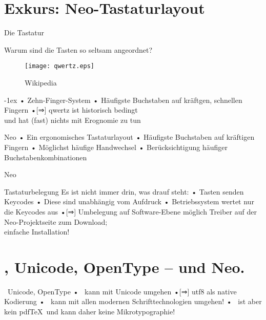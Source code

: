 \section{Exkurs: Neo-Tastaturlayout}
\begin{frame}{Die Tastatur}
\centerline{Warum sind die Tasten so seltsam angeordnet?}
\begin{figure}
\texttt{[image: qwertz.eps]}
\caption{ Wikipedia}
\end{figure}
\pause\kern-1ex
• Zehn-Finger-System
• Häufigste Buchstaben auf kräftgen, schnellen Fingern%
\pause%
•[⇒] \alert{qwertz ist historisch bedingt\\ und hat (fast) nichts mit Erognomie zu tun}
\• 
\end{frame}

\begin{frame}{Neo}
• Ein ergonomisches Tastaturlayout
• Häufigste Buchstaben auf kräftigen Fingern
• Möglichst häufige Handwechsel
• Berücksichtigung häufiger Buchstabenkombinationen
\•
\end{frame}

\begin{frame}{Neo}
\begin{figure}
\end{figure}
\end{frame}

\begin{frame}{Tastaturbelegung}
Es ist nicht immer drin, was drauf steht:
• Tasten senden Keycodes
• Diese sind unabhängig vom Aufdruck
• Betriebssystem wertet nur die Keycodes aus
•[⇒] Umbelegung auf Software-Ebene möglich%
\•
\pause
Treiber auf der Neo-Projektseite zum Download;\\ einfache Installation!
\end{frame}

\section{\XeLaTeX, Unicode, OpenType – und Neo.}
\begin{frame}{\XeTeX\, Unicode, OpenType}
• \XeTeX\ kann mit Unicode umgehen
•[⇒] utf8 als native Kodierung
• \XeTeX\ kann mit allen modernen Schrifttechnologien umgehen!\pause
• \XeTeX\ ist aber \alert{kein} pdf\TeX\ und kann daher \alert{keine} Mikrotypographie!
\•
\end{frame}

